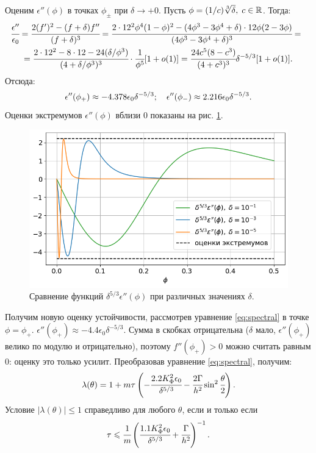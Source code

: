 Оценим $\epsilon''(\phi)$ в точках $\phi_{\pm}$ при $\delta \to +0$. Пусть $\phi = (1 / c) \sqrt[3]{\delta}, \; c \in {\mathbb{R}}$. Тогда:
\begin{multline*}
	\hspace{-2mm}
	\cfrac{\epsilon''}{\epsilon_0} = \cfrac{2(f')^2 - (f + \delta)f''}{(f + \delta)^3} = \cfrac{2 \cdot 12^2 \phi^4 (1 - \phi)^2 - (4 \phi^3 - 3 \phi^4 + \delta) \cdot 12 \phi (2 - 3 \phi)}{(4 \phi^3 - 3 \phi^4 + \delta)^3} = \\ = \cfrac{2 \cdot 12^2 - 8 \cdot 12 - 24 (\delta / \phi^3)}{(4 + \delta / \phi^3)^3} \cdot \cfrac{1}{\phi^5}[1 + o(1)] = \cfrac{24 c^5 (8 - c^3)}{(4 + c^3)^3} \delta^{-5 / 3} [1 + o(1)] \tpoint
\end{multline*}
Отсюда:
\begin{equation}
	\epsilon''(\phi_+) \approx -4.378 \epsilon_0 \delta^{-5 / 3}; \quad \epsilon''(\phi_-) \approx 2.216 \epsilon_0 \delta^{-5 / 3} {\text{.}}
	\label{est:epsilon_phi_phi_bounds}
\end{equation}
Оценки экстремумов $\epsilon''(\phi)$ вблизи $0$ показаны на рис. \ref{fig:eps_phi_phi_multiplied}.

\begin{figure}[!tp]
	\centering
	\includegraphics[width=\textwidth]{figures/eps_phi_phi_multiplied.png}
	\caption{Сравнение функций $\delta^{5 / 3} \epsilon''(\phi)$ при различных значениях $\delta$.}
	\label{fig:eps_phi_phi_multiplied}
\end{figure}

Получим новую оценку устойчивости, рассмотрев уравнение \eqref{eq:spectral} в точке $\phi = \phi_+$. $\epsilon''(\phi_+) \approx -4.4 \epsilon_0 \delta^{-5 / 3}$. Сумма в скобках отрицательна ($\delta$ мало, $\epsilon''(\phi_+)$ велико по модулю и отрицательно), поэтому $f''(\phi_+) > 0$ можно считать равным $0$: оценку это только усилит. Преобразовав уравнение \eqref{eq:spectral}, получим:
$$\lambda(\theta) = 1 + m \tau \left( -\cfrac{2.2 K_\Phi^2 \epsilon_0}{\delta^{5 / 3}} - \cfrac{2 \Gamma}{h^2} \sin^2 \cfrac{\theta}{2} \right) {\text{.}}$$
Условие $|\lambda(\theta)| \leqslant 1$ справедливо для любого $\theta$, если и только если
\begin{equation}
	\tau \leqslant \cfrac{1}{m} \left( \cfrac{1.1 K_\Phi^2 \epsilon_0}{\delta^{5 / 3}} + \cfrac{\Gamma}{h^2} \right)^{-1} {\text{.}}
	\label{cond:spectral_better_theoretical}
\end{equation}

